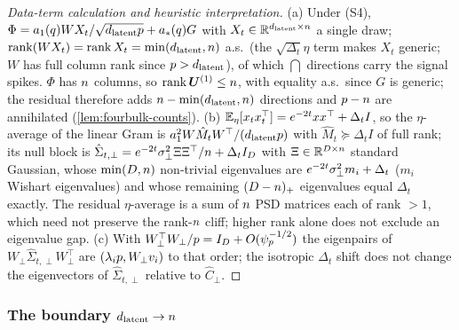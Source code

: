 \begin{proof}[Data-term calculation and heuristic interpretation]
(a) Under (S4), $\Phi=a_1(q)WX_t/\sqrt{d_{\mathrm{latent}}p}+a_*(q)G$ with $X_t\in\mathbb{R}^{d_{\mathrm{latent}}\times n}$ a single draw; $\operatorname{rank}(WX_t)=\operatorname{rank}X_t=\min(d_{\mathrm{latent}},n)$ a.s.\ (the $\sqrt{\Delta_t}\eta$ term makes $X_t$ generic; $W$ has full column rank since $p>d_{\mathrm{latent}}$), of which $\dint$ directions carry the signal spikes. $\Phi$ has $n$ columns, so $\operatorname{rank}\bm{U}^{(1)}\le n$, with equality a.s.\ since $G$ is generic; the residual therefore adds $n-\min(d_{\mathrm{latent}},n)$ directions and $p-n$ are annihilated (\cref{lem:fourbulk-counts}). (b) $\mathbb{E}_\eta[x_tx_t^\top]=e^{-2t}xx^\top+\Delta_tI$, so the $\eta$-average of the linear Gram is $a_1^2W\hat M_tW^\top/(d_{\mathrm{latent}}p)$ with $\hat M_t\succeq\Delta_tI$ of full rank; its null block is $\hat\Sigma_{t,\perp}=e^{-2t}\sigma_{\perp}^2\Xi\Xi^\top/n+\Delta_tI_D$ with $\Xi\in\mathbb{R}^{D\times n}$ standard Gaussian, whose $\min(D,n)$ non-trivial eigenvalues are $e^{-2t}\sigma_{\perp}^2m_i+\Delta_t$ ($m_i$ Wishart eigenvalues) and whose remaining $(D-n)_+$ eigenvalues equal $\Delta_t$ exactly. The residual $\eta$-average is a sum of $n$ PSD matrices each of rank $>1$, which need not preserve the rank-$n$ cliff; higher rank alone does not exclude an eigenvalue gap. (c) With $W_\perp^\top W_\perp/p=I_D+O(\psi_p^{-1/2})$ the eigenpairs of $W_\perp\hat\Sigma_{t,\perp}W_\perp^\top$ are $(\lambda_ip,W_\perp v_i)$ to that order; the isotropic $\Delta_t$ shift does not change the eigenvectors of $\hat\Sigma_{t,\perp}$ relative to $\hat C_\perp$.
\end{proof}

\subsubsection{The boundary $d_{\mathrm{latent}}\to n$}


